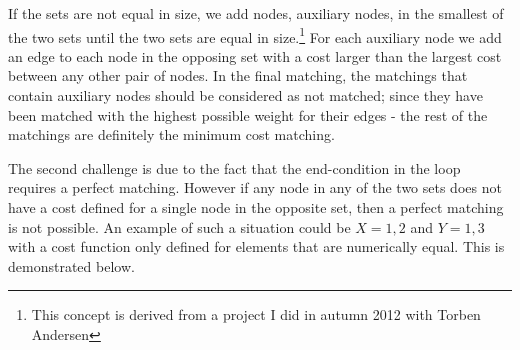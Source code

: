 \documentclass[11pt]{article}
\begin{document}
If the sets are not equal in size, we add nodes, auxiliary nodes, in the smallest of the two sets until the two sets are equal in size.\footnote{This concept is derived from a project I did in autumn 2012 with Torben Andersen} For each auxiliary node we add an edge to each node in the opposing set with a cost larger than the largest cost between any other pair of nodes. In the final matching, the matchings that contain auxiliary nodes should be considered as not matched; since they have been matched with the highest possible weight for their edges - the rest of the matchings are definitely the minimum cost matching.

The second challenge is due to the fact that the end-condition in the loop requires a perfect matching. However if any node in any of the two sets does not have a cost defined for a single node in the opposite set, then a perfect matching is not possible. An example of such a situation could be $X={1, 2}$ and $Y={1, 3}$ with a cost function only defined for elements that are numerically equal. This is demonstrated below. \\
\end{document}
